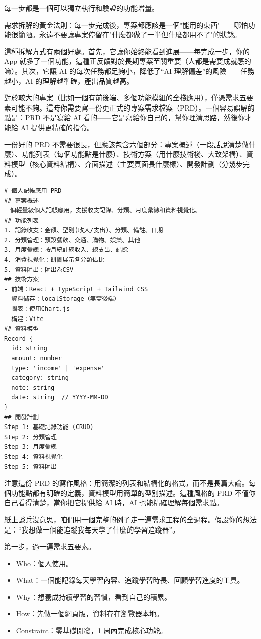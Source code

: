 每一步都是一個可以獨立執行和驗證的功能增量。

需求拆解的黃金法則：每一步完成後，專案都應該是一個"能用的東西"——哪怕功能很簡陋。永遠不要讓專案停留在"什麼都做了一半但什麼都用不了"的狀態。

這種拆解方式有兩個好處。首先，它讓你始終能看到進展——每完成一步，你的 App 就多了一個功能，這種正反饋對於長期專案至關重要（人都是需要成就感的嘛）。其次，它讓 AI 的每次任務都足夠小，降低了“AI 理解偏差”的風險——任務越小，AI 的理解越準確，產出品質越高。


對於較大的專案（比如一個有前後端、多個功能模組的全棧應用），僅憑需求五要素可能不夠。這時你需要寫一份更正式的專案需求檔案（PRD）。一個容易誤解的點是：PRD 不是寫給 AI 看的——它是寫給你自己的，幫你理清思路，然後你才能給 AI 提供更精確的指令。

一份好的 PRD 不需要很長，但應該包含六個部分：專案概述（一段話說清楚做什麼）、功能列表（每個功能點是什麼）、技術方案（用什麼技術棧、大致架構）、資料模型（核心資料結構）、介面描述（主要頁面長什麼樣）、開發計劃（分幾步完成）。

\begin{lstlisting}
# 個人記帳應用 PRD
## 專案概述
一個輕量級個人記帳應用，支援收支記錄、分類、月度彙總和資料視覺化。
## 功能列表
1. 記錄收支：金額、型別(收入/支出)、分類、備註、日期
2. 分類管理：預設餐飲、交通、購物、娛樂、其他
3. 月度彙總：按月統計總收入、總支出、結餘
4. 消費視覺化：餅圖展示各分類佔比
5. 資料匯出：匯出為CSV
## 技術方案
- 前端：React + TypeScript + Tailwind CSS
- 資料儲存：localStorage（無需後端）
- 圖表：使用Chart.js
- 構建：Vite
## 資料模型
Record {
  id: string
  amount: number
  type: 'income' | 'expense'
  category: string
  note: string
  date: string  // YYYY-MM-DD
}
## 開發計劃
Step 1: 基礎記錄功能 (CRUD)
Step 2: 分類管理
Step 3: 月度彙總
Step 4: 資料視覺化
Step 5: 資料匯出
\end{lstlisting}

注意這份 PRD 的寫作風格：用簡潔的列表和結構化的格式，而不是長篇大論。每個功能點都有明確的定義，資料模型用簡單的型別描述。這種風格的 PRD 不僅你自己看得清楚，當你把它提供給 AI 時，AI 也能精確理解每個需求點。


紙上談兵沒意思，咱們用一個完整的例子走一遍需求工程的全過程。假設你的想法是：“我想做一個能追蹤我每天學了什麼的學習追蹤器”。

第一步，過一遍需求五要素。

\begin{itemize}
  \item Who：個人使用。
  \item What：一個能記錄每天學習內容、追蹤學習時長、回顧學習進度的工具。
  \item Why：想養成持續學習的習慣，看到自己的積累。
  \item How：先做一個網頁版，資料存在瀏覽器本地。
  \item Constraint：零基礎開發，1 周內完成核心功能。
\end{itemize}

